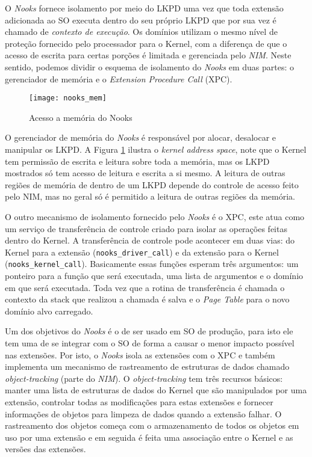 O \emph{Nooks} fornece isolamento por meio do LKPD uma vez que toda extensão
adicionada ao SO executa dentro do seu próprio LKPD que por sua vez é chamado
de \emph{contexto de execução}. Os domínios utilizam o mesmo nível de proteção
fornecido pelo processador para o Kernel, com a diferença de que o acesso de
escrita para certas porções é limitada e gerenciada pelo \emph{NIM}. Neste
sentido, podemos dividir o esquema de isolamento do \emph{Nooks} em duas partes:
o gerenciador de memória e o \emph{Extension Procedure Call} (XPC).

\begin{figure}[!h]
  \centering
  \texttt{[image: nooks\_mem]}
  \caption{Acesso a memória do Nooks \citep{nooks}}
  \label{fig:nooks_mem}
\end{figure}

O gerenciador de memória do \emph{Nooks} é responsável por alocar, desalocar e
manipular os LKPD. A Figura \ref{fig:nooks_mem} ilustra o \textit{kernel
address space}, note que o Kernel tem permissão de escrita e leitura sobre toda
a memória, mas os LKPD mostrados só tem acesso de leitura e escrita a si mesmo.
A leitura de outras regiões de memória de dentro de um LKPD depende do controle
de acesso feito pelo NIM, mas no geral só é permitido a leitura de outras
regiões da memória.

O outro mecanismo de isolamento fornecido pelo \emph{Nooks} é o XPC, este atua
como um serviço de transferência de controle criado para isolar as operações
feitas dentro do Kernel. A transferência de controle pode acontecer em duas
vias: do Kernel para a extensão (\texttt{nooks\_driver\_call}) e da extensão
para o Kernel (\texttt{nooks\_kernel\_call}). Basicamente essas funções esperam
três argumentos: um ponteiro para a função que será executada, uma lista de
argumentos e o domínio em que será executada. Toda vez que a rotina de
transferência é chamada o contexto da stack que realizou a chamada é salva e o
\emph{Page Table} para o novo domínio alvo carregado.

Um dos objetivos do \emph{Nooks} é o de ser usado em SO de produção, para isto
ele tem uma de se integrar com o SO de forma a causar o menor impacto possível
nas extensões. Por isto, o \emph{Nooks} isola as extensões com o XPC e também
implementa um mecanismo de rastreamento de estruturas de dados chamado
\emph{object-tracking} (parte do \emph{NIM}). O \emph{object-tracking} tem três
recursos básicos: manter uma lista de estruturas de dados do Kernel que são
manipulados por uma extensão, controlar todas as modificações para estas
extensões e fornecer informações de objetos para limpeza de dados quando a
extensão falhar. O rastreamento dos objetos começa com o armazenamento de todos
os objetos em uso por uma extensão e em seguida é feita uma associação entre o
Kernel e as versões das extensões.

